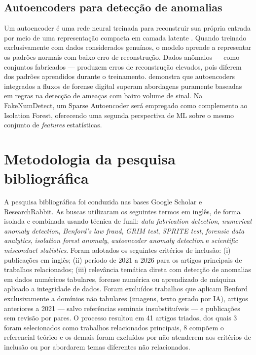 \documentclass[
    12pt,                %
    openright,           %
    oneside,             %
    a4paper,             %
    english,             %
    brazil               %
]{abntex2}
\begin{document}
\subsection{Autoencoders para detecção de anomalias}

Um autoencoder é uma rede neural treinada para reconstruir sua própria entrada por meio de uma representação compacta em camada latente \cite{Ng2011}. Quando treinado exclusivamente com dados considerados genuínos, o modelo aprende a representar os padrões normais com baixo erro de reconstrução. Dados anômalos — como conjuntos fabricados — produzem erros de reconstrução elevados, pois diferem dos padrões aprendidos durante o treinamento.
 demonstra que autoencoders integrados a fluxos de forense digital superam abordagens puramente baseadas em regras na detecção de ameaças com baixo volume de sinal. Na FakeNumDetect, um Sparse Autoencoder será empregado como complemento ao Isolation Forest, oferecendo uma segunda perspectiva de ML sobre o mesmo conjunto de \textit{features} estatísticas.

\section{Metodologia da pesquisa bibliográfica}
\label{sec:metodologia_pesquisa}

A pesquisa bibliográfica foi conduzida nas bases Google Scholar e ResearchRabbit. As buscas utilizaram os seguintes termos em inglês, de forma isolada e combinada usando técnica de funil: \textit{data fabrication detection}, \textit{numerical anomaly detection}, \textit{Benford's law fraud}, \textit{GRIM test}, \textit{SPRITE test}, \textit{forensic data analytics}, \textit{isolation forest anomaly}, \textit{autoencoder anomaly detection} e \textit{scientific misconduct statistics}.
Foram adotados os seguintes critérios de inclusão: (i) publicações em inglês; (ii) período de 2021 a 2026 para os artigos principais de trabalhos relacionados; (iii) relevância temática direta com detecção de anomalias em dados numéricos tabulares, forense numérica ou aprendizado de máquina aplicado a integridade de dados. Foram excluídos trabalhos que aplicam Benford exclusivamente a domínios não tabulares (imagens, texto gerado por IA), 
artigos anteriores a 2021 — salvo referências seminais insubstituíveis — e publicações sem revisão por pares.
O processo resultou em 41 artigos triados, dos quais 3 foram selecionados como trabalhos relacionados principais, 8 compõem o referencial teórico e os demais foram excluídos por não atenderem aos critérios de inclusão ou por abordarem temas diferentes não relacionados.
\end{document}

